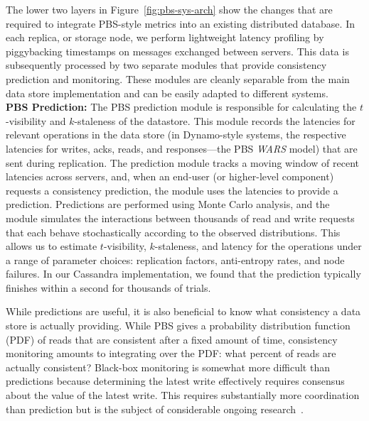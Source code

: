 The lower two layers in Figure~\ref{fig:pbs-sys-arch} show the changes
that are required to integrate PBS-style metrics into an existing
distributed database. In each replica, or storage node, we perform
lightweight latency profiling by piggybacking timestamps on messages
exchanged between servers. This data is subsequently processed by two
separate modules that provide consistency prediction and monitoring.
These modules are cleanly separable from the main data
store implementation and can be easily adapted to different systems.\\
\textbf{PBS Prediction:} The PBS prediction module is responsible for
calculating the $t$-visibility and $k$-staleness of the
datastore. This module records the latencies for relevant operations
in the data store (in Dynamo-style systems, the respective latencies
for writes, acks, reads, and responses---the PBS \textit{WARS} model)
that are sent during replication.  The prediction module tracks a
moving window of recent latencies across servers, and, when an
end-user (or higher-level component) requests a consistency
prediction, the module uses the latencies to provide a
prediction. Predictions are performed using Monte Carlo analysis, and
the module simulates the interactions between thousands of read and
write requests %
that each behave stochastically according to the observed distributions. This
allows us to estimate $t$-visibility, $k$-staleness, and latency for
the operations under a range of parameter choices: replication
factors, anti-entropy rates, and node failures. In our Cassandra
implementation, we found that the prediction typically finishes within
a second for thousands of trials.

 While predictions are useful, it is
also beneficial to know what consistency a data store is actually providing.
While PBS gives a probability distribution function (PDF) of reads that are
consistent after a fixed amount of time, consistency monitoring amounts to
integrating over the PDF: what percent of reads are actually consistent?
Black-box monitoring is somewhat more difficult than predictions because
determining the latest write effectively requires consensus about the value of
the latest write. This requires substantially more coordination than prediction
but is the subject of considerable ongoing research~\cite{hotdep}. 

